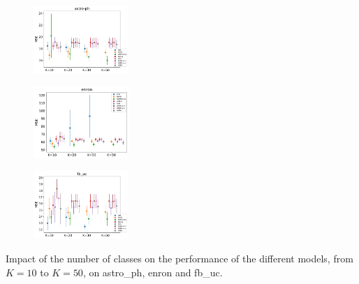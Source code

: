 \begin{subfigure}
     \centering
         \includegraphics[width=0.32\textwidth]{fig2/astro-ph_wsim3_evo2__}
\end{subfigure}
\begin{subfigure}
         \centering
      \includegraphics[width=0.32\textwidth]{fig2/enron_wsim3_evo2__}   
\end{subfigure}  
\begin{subfigure}
         \centering          
      \includegraphics[width=0.32\textwidth]{fig2/fb_uc_wsim3_evo2__}
\end{subfigure}  
\caption{Impact of the number of classes on the performance of the different models, from $K=10$ to $K=50$, on astro\_ph, enron and fb\_uc.}

